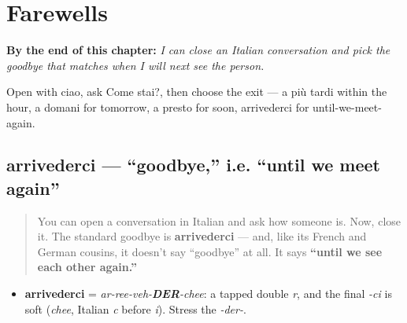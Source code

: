 
\chapter{Farewells}
\label{ch:it-farewells}

\begin{chapteropening}
\textbf{By the end of this chapter:} \emph{I can close an Italian conversation and pick the goodbye that matches when I will next see the person.}

Open with ciao, ask Come stai?, then choose the exit — a più tardi within the hour, a domani for tomorrow, a presto for soon, arrivederci for until-we-meet-again.
\end{chapteropening}

\section[arrivederci]{arrivederci — \textquotedblleft{}goodbye,\textquotedblright{} i.e. \textquotedblleft{}until we meet again\textquotedblright{}}

\label{lesson:IT-C04-arrivederci}



\begin{quote}
You can open a conversation in Italian and ask how someone is. Now, close it. The standard goodbye is \textbf{arrivederci} — and, like its French and German cousins, it doesn't say \textquotedblleft{}goodbye\textquotedblright{} at all. It says \textbf{\textquotedblleft{}until we see each other again.\textquotedblright{}}
\end{quote}

\begin{sounds}
\begin{itemize}
\raggedright
  \item \textbf{arrivederci} = \emph{ar-ree-veh-\textbf{DER}-chee}: a tapped double \emph{r}, and the final \emph{-ci} is soft (\emph{chee}, Italian \emph{c} before \emph{i}). Stress the \emph{-der-}.
\end{itemize}
\end{sounds}

